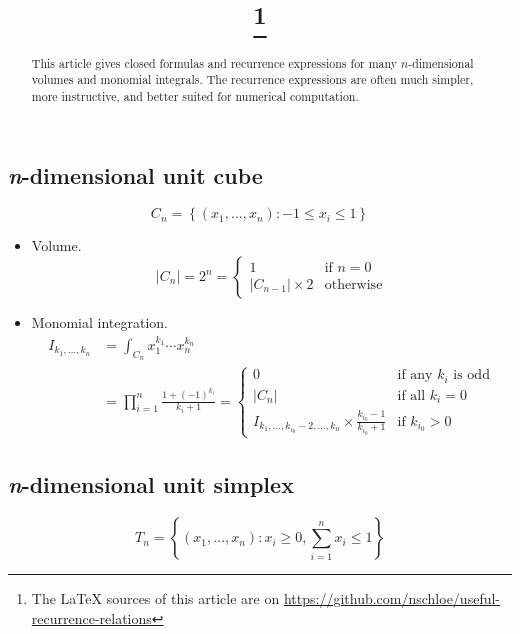 \documentclass[final]{scrartcl}
\title{\mytitle\footnote{The LaTeX sources of this article are on
\url{https://github.com/nschloe/useful-recurrence-relations}}}
\author{\myauthor}
\begin{document}
\maketitle
\begin{abstract}
  This article gives closed formulas and recurrence expressions for many $n$-dimensional
  volumes and monomial integrals. The recurrence expressions are often much simpler,
  more instructive, and better suited for numerical computation.
\end{abstract}

\subsection*{\textit{n}-dimensional unit cube}
\[
  C_n = \left\{(x_1,\dots,x_n): -1 \le x_i \le 1\right\}
\]

\begin{itemize}
  \item Volume.
    \begin{equation}
      |C_n| = 2^n = \begin{cases}
        1&\text{if $n=0$}\\
        |C_{n-1}| \times 2&\text{otherwise}
      \end{cases}
    \end{equation}
  \item Monomial integration.
  \begin{align}\nonumber
    I_{k_1,\dots,k_n}
    &= \int_{C_n} x_1^{k_1}\cdots x_n^{k_n}\\
      &= \prod_{i=1}^n \frac{1 + (-1)^{k_i}}{k_i+1}
    =\begin{cases}
      0&\text{if any $k_i$ is odd}\\
      |C_n|&\text{if all $k_i=0$}\\
      I_{k_1,\dots,k_{i_0}-2,\dots,k_n} \times \frac{k_{i_0}-1}{k_{i_0}+1}&\text{if $k_{i_0} > 0$}
    \end{cases}
  \end{align}
\end{itemize}

\subsection*{\textit{n}-dimensional unit simplex}
\[
  T_n = \left\{(x_1,\dots,x_n):x_i \geq 0, \sum_{i=1}^n x_i \leq 1\right\}
\]
\end{document}
